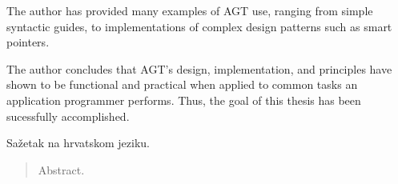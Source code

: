 \documentclass[times, utf8, diplomski]{fer}
\theoremstyle{definition}
\begin{document}
The author has provided many examples of AGT use, ranging from simple syntactic guides,
to implementations of complex design patterns such as smart pointers.

The author concludes that AGT's design, implementation, and principles have shown to be
functional and practical when applied to common tasks an application programmer performs. 
Thus, the goal of this thesis has been sucessfully accomplished.




\begin{sazetak}
Sažetak na hrvatskom jeziku.

\end{sazetak}

\begin{abstract}
Abstract.

\end{abstract}
\end{document}
